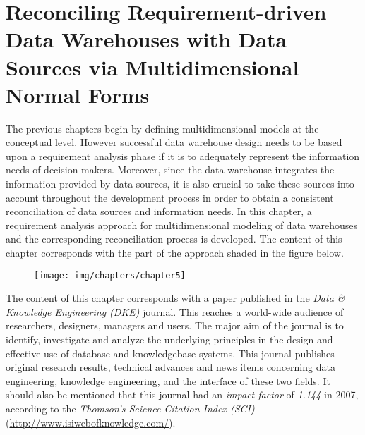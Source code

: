 %
%
%




\chapter{Reconciling Requirement-driven Data Warehouses with Data Sources via Multidimensional Normal Forms}
\label{c5} %

The previous chapters begin by defining multidimensional models at
the conceptual level. However successful data warehouse design needs
to be based upon a requirement analysis phase if it is to adequately
represent the information needs of decision makers. Moreover, since
the data warehouse integrates the information provided by data
sources, it is also crucial to take these sources into account
throughout the development process in order to obtain a consistent
reconciliation of data sources and information needs. In this
chapter, a requirement analysis approach for multidimensional
modeling of data warehouses and the corresponding reconciliation
process is developed. The content of this chapter corresponds with
the part of the approach shaded in the figure below.


\begin{figure}[h!]
  \begin{center}
    \texttt{[image: img/chapters/chapter5]}
  \end{center}
\end{figure}


The content of this chapter corresponds with a paper published in
the \emph{Data \& Knowledge Engineering (DKE)} journal. This reaches
a world-wide audience of researchers, designers, managers and users.
The major aim of the journal is to identify, investigate and analyze
the underlying principles in the design and effective use of
database and knowledgebase systems. This journal publishes original
research results, technical advances and news items concerning data
engineering, knowledge engineering, and the interface of these two
fields. It should also be mentioned that this journal had an
\emph{impact factor} of \emph{1.144} in 2007, according to the
\emph{Thomson's Science Citation Index (SCI)}
(\url{http://www.isiwebofknowledge.com/}).

